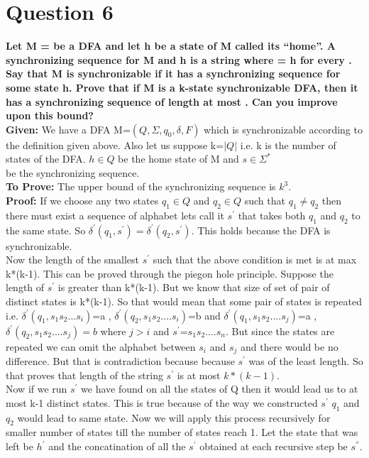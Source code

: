 \documentclass{article}
\begin{document}
\pagebreak

\section{Question 6}
\textbf{Let M =  be a DFA and let h be a state of M called its “home”. A synchronizing
sequence for M and h is a string  where  = h for every . Say that M
is synchronizable if it has a synchronizing sequence for some state h. Prove that if M is a
k-state synchronizable DFA, then it has a synchronizing sequence of length at most  . Can you improve upon this bound?} \\
\newline
\textbf{Given:} We have a DFA M=$(Q, \Sigma, q_0 , \delta, F )$ which is synchronizable according to the definition given above. Also let us suppose k=$|Q|$ i.e. k is the number of states of the DFA. $h\in Q$ be the home state of M and $s\in\Sigma^{*}$\\ be the synchronizing sequence.\\ 
\textbf{To Prove:} The upper bound of the synchronizing sequence is $k^3$.\\
\textbf{Proof:} If we choose any two states $q_1\in Q$ and $q_2\in Q$ such that $q_1 \neq q_2$ then there must exist a sequence of alphabet lets call it $s^{'}$ that takes both $q_1$ and $q_2$ to the same state. So $\delta^{'}(q_1,s^{'})=\delta^{'}(q_2,s^{'})$. This holds because the DFA is synchronizable.\\
Now the length of the smallest $s^{'}$ such that the above condition is met is at max k*(k-1). This can be proved through the piegon hole principle. Suppose the length of $s^{'}$ is greater than k*(k-1). But we know that size of set of pair of distinct states is k*(k-1). So that would mean that some pair of states is repeated i.e. $\delta^{'}(q_1,s_1s_2...s_i)$=a , $\delta^{'}(q_2,s_1s_2....s_i)$=b and $\delta^{'}(q_1,s_1s_2....s_j)$=a , $\delta^{'}(q_2,s_1s_2....s_j)=b$ where $j>i$ and $s^{'}$=$s_1s_2....s_n$. But since the states are repeated we can omit the alphabet between $s_i$ and $s_j$ and there would be no difference. But that is contradiction because because $s^{'}$ was of the least length. So that proves that length of the string $s^{'}$ is at most $k*(k-1)$. \\
Now if we run $s^{'}$ we have found on all the states of Q then it would lead us to at most k-1 distinct states. This is true because of the way we constructed $s^{'}$ $q_1$ and $q_2$ would lead to same state. Now we will apply this process recursively for smaller number of states till the number of states reach 1. Let the state that was left be $h^{'}$ and the concatination of all the $s^{'}$ obtained  at each recursive step be $s^{''}$. \\
\end{document}
